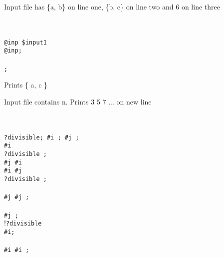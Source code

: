 \documentclass[11pt]{article}
\begin{document}
\begin{multicols}{2}

Input file has \{a, b\} on line one, \{b, c\} on line two and 6 on line three 
\begin{texto}
    \texttt{\\
    \BEGIN\\
    	\tab \FOR @inp \IN \textcolor{tokens}{\$input1} \DO\\
	\tab \tab \INPUT \ASS \INPUT \REMOVE @inp;\\
    	\tab \DONE\\
    	\tab \PRINT \INPUT;\\
    \END
	 }
\end{texto}

Prints \{ a, c \}

\columnbreak

Input file contains n. Prints 3 5 7 ... on new line
\begin{texto}
    \texttt{\\
    \BEGIN\\
    	\tab \LET ?divisible; \LET \#i ; \LET \#j ;\\
    	\tab \FOR \#i \LT \OC \DO\\
    	\tab \tab ?divisible \ASS \FALSE;\\
    	\tab \tab \FOR \#j \LT \#i \DO\\
    	\tab \tab \tab \IF \#i \MOD \#j  \THEN \\	
    	\tab \tab \tab \tab ?divisible \ASS \TRUE;\\
    	\tab \tab \tab \FI\\
    	\tab \tab \tab \#j \ASS \#j ;\\
    	\tab \tab \DONE\\
    	\tab \#j ;\\
    	\tab \IF \textcolor{tokens}{$!$}?divisible \THEN\\
    	\tab \tab \PRINT \#i;\\
    	\tab \FI\\
    	\tab \#i \ASS \#i ;\\
    	\tab \DONE\\
    \END
	 }
\end{texto}

\end{multicols}
\end{document}
